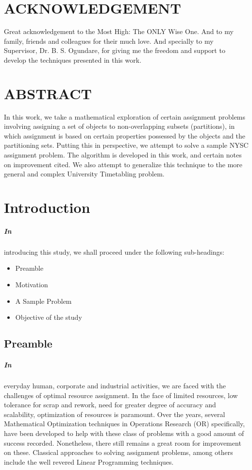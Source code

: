 \documentclass[a4paper,openany]{book}
\begin{document}
	\chapter[ACKNOWLEDGEMENT]{ \centering ACKNOWLEDGEMENT}
		Great acknowledgement to the Most High: The ONLY Wise One. And to my family, friends and colleagues for their much love. And specially to my Supervisor, Dr. B. S. Ogundare, for giving me the freedom and support to develop the techniques presented in this work.
	\chapter[ABSTRACT]{ \centering ABSTRACT}
		In this work, we take a mathematical exploration of certain assignment problems involving assigning a set of objects to non-overlapping subsets (partitions), in which assignment is based on certain properties possessed by the objects and the partitioning sets. Putting this in perspective, we attempt to solve a sample NYSC assignment problem. The algorithm is developed in this work, and certain notes on improvement cited.  We also attempt to generalize this technique to the more general and complex University Timetabling problem.
	\tableofcontents
	\listoftables
	\mainmatter
    \linespread{2.0}
    \chapter{Introduction}
        \paragraph{In}
        introducing this study, we shall proceed under the following sub-headings:
        \begin{itemize}
            \item Preamble
            \item Motivation
            \item A Sample Problem
            \item Objective of the study
        \end{itemize}
        \section{Preamble}
        \paragraph{In}
			everyday human, corporate and industrial activities, we are faced with the challenges of optimal resource assignment. In the face of limited resources, low tolerance for scrap and rework, need for greater degree of accuracy and scalability, optimization of resources is paramount.
            Over the years, several Mathematical Optimization techniques in Operations Research (OR) specifically, have been developed to help with these class of problems with a good amount of success recorded. Nonetheless, there still remains a great room for improvement on these. Classical approaches to solving assignment problems, among others include the well revered Linear Programming techniques.
\end{document}
